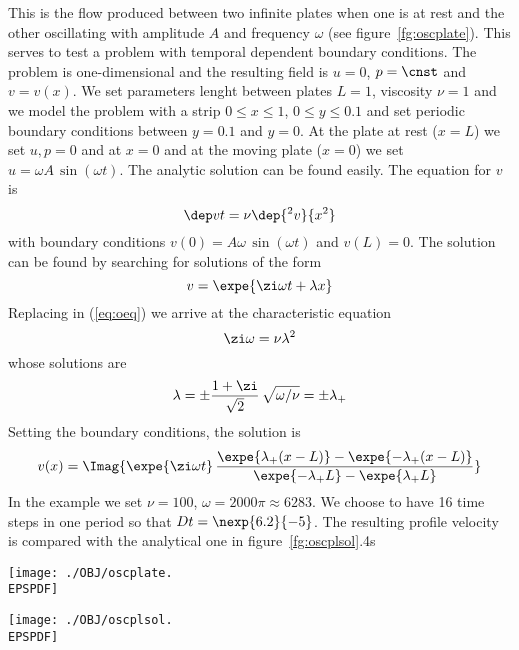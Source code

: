 This is the flow produced between two infinite plates when one is at
rest and the other oscillating with amplitude $A$ and frequency
$\omega$ (see figure~\ref{fg:oscplate}).  This serves to test a
problem with temporal dependent boundary conditions.  The problem is
one-dimensional and the resulting field is $u=0$, $p=\cnst$ and
$v=v(x)$. We set parameters lenght between plates $L=1$, viscosity
$\nu=1$ and we model the problem with a strip $0\le x \le 1$, $0\le y
\le 0.1$ and set periodic boundary conditions between $y=0.1$ and
$y=0$. At the plate at rest ($x=L$) we set $u,p=0$ and at $x=0$ and at
the moving plate ($x=0$) we set $u=\omega A \, \sin(\omega
t)$. The analytic solution can be found easily.  The
equation for $v$ is
%
\begin{equation}\label{eq:oeq}  
  \dep vt = \nu \dep {^2v}{x^2}
\end{equation}
%
with boundary conditions $v(0)=A\omega \, \sin(\omega t)$ and
$v(L)=0$. The solution can be found by searching for solutions of the
form
%
\begin{equation} 
   v = \expe{\zi\omega t+\lambda x}
\end{equation}
%
Replacing in (\ref{eq:oeq}) we arrive at the characteristic equation
%
\begin{equation} 
   \zi\omega  = \nu\lambda^2 
\end{equation}
%
whose solutions are
%
\begin{equation} 
    \lambda = \pm \frac{1+\zi}{\sqrt2} \, \sqrt{\omega/\nu} = \pm \lambda_+
\end{equation}
%
Setting the boundary conditions, the solution is
%
\begin{equation} 
   v(x) = \Imag{\expe{\zi\omega t} \, 
       \frac{ \expe{\lambda_+(x-L)} - \expe{-\lambda_+(x-L)}}
            { \expe{-\lambda_+L} - \expe{\lambda_+L}}}
\end{equation}
%
In the example we set $\nu=100$, $\omega=2000\pi\approx 6283$. We
choose to have 16 time steps in one period so that $Dt =
\nexp{6.2}{-5}$. The resulting profile velocity is compared with the
analytical one in figure~\ref{fg:oscplsol}.4s

\begin{figure*}[htb]
\centerline{\texttt{[image: ./OBJ/oscplate.\\EPSPDF]}}
\caption{Oscillating plates.}
\label{fg:oscplate}
\end{figure*}
 
\begin{figure*}[htb]
\centerline{\texttt{[image: ./OBJ/oscplsol.\\EPSPDF]}}
\caption{Velocity profile for the oscilating plate problem.}
\label{fg:oscplsol}
\end{figure*}

